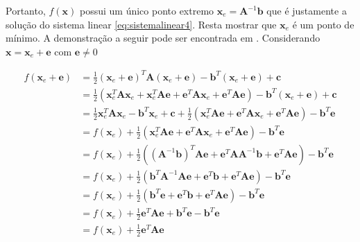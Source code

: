 Portanto, $f(\mathbf{x})$ possui um único ponto extremo $\mathbf{x}_e = \mathbf{A}^{-1}\mathbf{b}$ que é justamente a solução do sistema linear \eqref{eq:sistemalinear4}. Resta mostrar que $\mathbf{x}_e$ é um ponto de mínimo. A demonstração a seguir pode ser encontrada em \citet{Shewchuk94anintroduction}. Considerando $\mathbf{x} = \mathbf{x}_e + \mathbf{e}$ com $\mathbf{e} \neq 0 $


\begin{align}
     f(\mathbf{x}_e + \mathbf{e}) & =  \frac{1}{2} (\mathbf{x}_e + \mathbf{e})^T \mathbf{A} (\mathbf{x}_e + \mathbf{e}) - \mathbf{b}^T(\mathbf{x}_e + \mathbf{e}) + \mathbf{c}  \nonumber\\
                & =  \frac{1}{2} (\mathbf{x}_e^T\mathbf{A}\mathbf{x}_e + \mathbf{x}_e^T\mathbf{A}\mathbf{e} + \mathbf{e}^T\mathbf{A}\mathbf{x}_e + \mathbf{e}^T\mathbf{A}\mathbf{e} )- \mathbf{b}^T(\mathbf{x}_e + \mathbf{e}) + \mathbf{c}  \nonumber\\
                & =  \frac{1}{2} \mathbf{x}_e^T\mathbf{A}\mathbf{x}_e -\mathbf{b}^T\mathbf{x}_e + \mathbf{c} + \frac{1}{2} ( \mathbf{x}_e^T\mathbf{A}\mathbf{e} + \mathbf{e}^T\mathbf{A}\mathbf{x}_e + \mathbf{e}^T\mathbf{A}\mathbf{e} ) - \mathbf{b}^T\mathbf{e}  \nonumber\\
                & =  f(\mathbf{x}_e) + \frac{1}{2} ( \mathbf{x}_e^T\mathbf{A}\mathbf{e} + \mathbf{e}^T\mathbf{A}\mathbf{x}_e + \mathbf{e}^T\mathbf{A}\mathbf{e} ) - \mathbf{b}^T\mathbf{e}  \nonumber\\
                & =  f(\mathbf{x}_e) + \frac{1}{2} ( (\mathbf{A}^{-1}\mathbf{b})^T\mathbf{A}\mathbf{e} + \mathbf{e}^T\mathbf{A}\mathbf{A}^{-1}\mathbf{b} + \mathbf{e}^T\mathbf{A}\mathbf{e} ) - \mathbf{b}^T\mathbf{e}  \nonumber\\
                & =  f(\mathbf{x}_e) + \frac{1}{2} ( \mathbf{b}^T\mathbf{A}^{-1}\mathbf{A}\mathbf{e} + \mathbf{e}^T\mathbf{b} + \mathbf{e}^T\mathbf{A}\mathbf{e} ) - \mathbf{b}^T\mathbf{e}  \nonumber\\
                & =  f(\mathbf{x}_e) + \frac{1}{2} ( \mathbf{b}^T\mathbf{e} + \mathbf{e}^T\mathbf{b} + \mathbf{e}^T\mathbf{A}\mathbf{e} ) - \mathbf{b}^T\mathbf{e}  \nonumber\\
                & =  f(\mathbf{x}_e) + \frac{1}{2}  \mathbf{e}^T\mathbf{A}\mathbf{e}  + \mathbf{b}^T\mathbf{e} - \mathbf{b}^T\mathbf{e}  \nonumber\\
                & =  f(\mathbf{x}_e) + \frac{1}{2}  \mathbf{e}^T\mathbf{A}\mathbf{e} \nonumber
\end{align}


